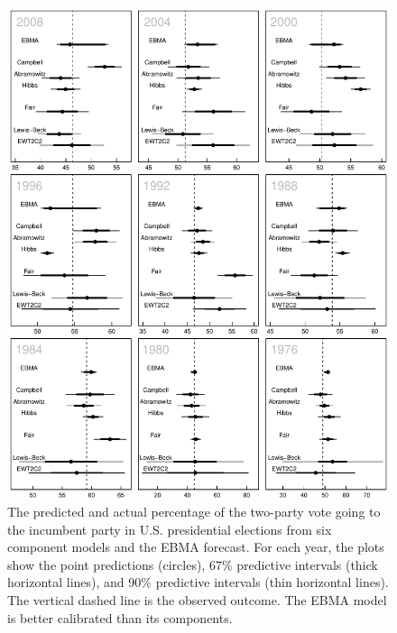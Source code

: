  \begin{figure}[p]
   \caption{\footnotesize The predicted and actual percentage of the
     two-party vote going to the incumbent party in U.S. presidential
     elections from six component models and the EBMA forecast.  For
     each year, the plots show the point predictions (circles), 67\%
     predictive intervals (thick horizontal lines), and 90\%
     predictive intervals (thin horizontal lines).  The vertical
     dashed line is the observed outcome.  The EBMA model is
   better calibrated than its components. }
 \label{PresPlots2}
 \begin{center}
 \includegraphics[width=5.6 in]{PresPlot2-1.pdf}
 \end{center}
 \end{figure}

